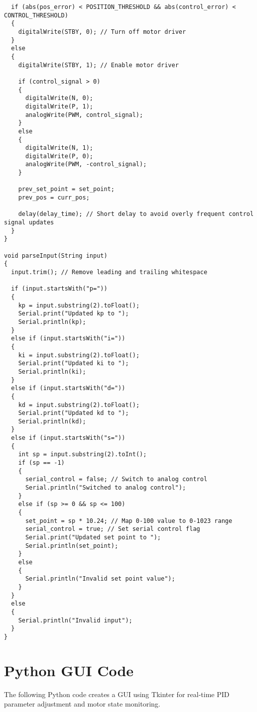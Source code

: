 \documentclass{article}
\begin{document}
\begin{verbatim}
  if (abs(pos_error) < POSITION_THRESHOLD && abs(control_error) < CONTROL_THRESHOLD)
  {
    digitalWrite(STBY, 0); // Turn off motor driver
  }
  else
  {
    digitalWrite(STBY, 1); // Enable motor driver

    if (control_signal > 0)
    {
      digitalWrite(N, 0);
      digitalWrite(P, 1);
      analogWrite(PWM, control_signal);
    }
    else
    {
      digitalWrite(N, 1);
      digitalWrite(P, 0);
      analogWrite(PWM, -control_signal);
    }

    prev_set_point = set_point;
    prev_pos = curr_pos;

    delay(delay_time); // Short delay to avoid overly frequent control signal updates
  }
}

void parseInput(String input)
{
  input.trim(); // Remove leading and trailing whitespace

  if (input.startsWith("p="))
  {
    kp = input.substring(2).toFloat();
    Serial.print("Updated kp to ");
    Serial.println(kp);
  }
  else if (input.startsWith("i="))
  {
    ki = input.substring(2).toFloat();
    Serial.print("Updated ki to ");
    Serial.println(ki);
  }
  else if (input.startsWith("d="))
  {
    kd = input.substring(2).toFloat();
    Serial.print("Updated kd to ");
    Serial.println(kd);
  }
  else if (input.startsWith("s="))
  {
    int sp = input.substring(2).toInt();
    if (sp == -1)
    {
      serial_control = false; // Switch to analog control
      Serial.println("Switched to analog control");
    }
    else if (sp >= 0 && sp <= 100)
    {
      set_point = sp * 10.24; // Map 0-100 value to 0-1023 range
      serial_control = true; // Set serial control flag
      Serial.print("Updated set point to ");
      Serial.println(set_point);
    }
    else
    {
      Serial.println("Invalid set point value");
    }
  }
  else
  {
    Serial.println("Invalid input");
  }
}
\end{verbatim}

\section{Python GUI Code}
The following Python code creates a GUI using Tkinter for real-time PID parameter adjustment and motor state monitoring.
\end{document}
